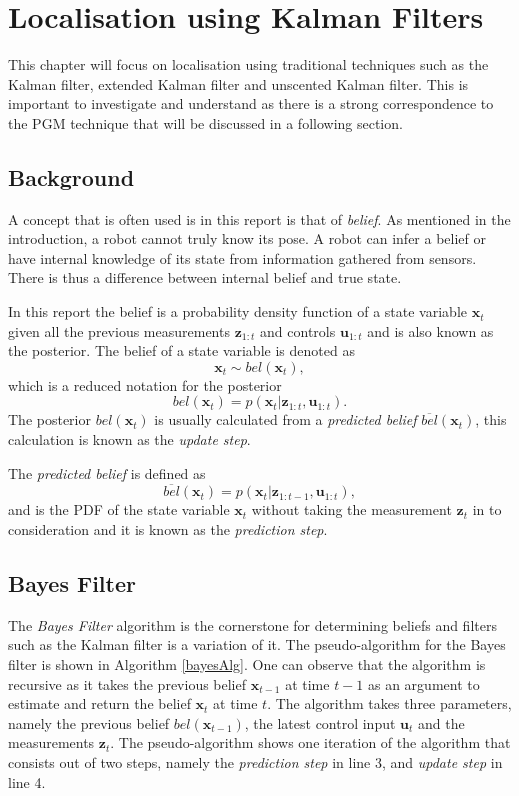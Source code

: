 \documentclass[12pt,oneside,openany,a4paper, %
afrikaans,english,
]{memoir}
\numberwithin{equation}{chapter}
\begin{document}
\chapter{Localisation using Kalman Filters}
This chapter will focus on localisation using traditional techniques such as the Kalman filter, extended Kalman filter and unscented Kalman filter. This is important to investigate and understand as there is a strong correspondence to the PGM technique that will be discussed in a following section.
\section{Background}
A concept that is often used is in this report is that of \textit{belief}. As mentioned in the introduction, a robot cannot truly know its pose. A robot can infer a belief or have internal knowledge of its state from information gathered from sensors. There is thus a difference between internal belief and true state.

In this report the belief is a probability density function of a state variable $\bm{x}_t$ given all the previous measurements $\bm{z}_{1:t}$  and controls $\bm{u}_{1:t}$ and is also known as the posterior. The belief of a state variable is denoted as
\begin{equation}
\bm{x}_t \sim bel(\bm{x}_t),
\end{equation}
which is a reduced notation for the posterior
\begin{equation}
bel(\bm{x}_t) = p(\bm{x}_t| \bm{z}_{1:t}, \bm{u}_{1:t}).
\end{equation}
The posterior $bel(\bm{x}_t)$ is usually calculated from a \textit{predicted belief} $\overline{bel}(\bm{x}_t)$, this calculation is known as the \textit{update step}.

The \textit{predicted belief} is defined as
\begin{equation}
\overline{bel}(\bm{x}_t) = p(\bm{x}_t|\bm{z}_{1:t-1}, \bm{u}_{1:t}),
\end{equation} 
and is the PDF of the state variable $\bm{x}_t$ without taking the measurement $\bm{z}_t$ in to consideration and it is known as the \textit{prediction step}.
\section{Bayes Filter}
The \textit{Bayes Filter} algorithm is the cornerstone for determining beliefs and filters such as the Kalman filter is a variation of it. The pseudo-algorithm for the Bayes filter is shown in Algorithm \ref{bayesAlg}. One can observe that the algorithm is recursive as it takes the previous belief $\bm{x}_{t-1}$ at time $t-1$ as an argument to estimate and return the belief $\bm{x}_t$ at time $t$. The algorithm takes three parameters, namely the previous belief $bel(\bm{x}_{t-1})$, the latest control input $\bm{u}_t$ and the measurements $\bm{z}_t$. The pseudo-algorithm shows one iteration of the algorithm that consists out of two steps, namely the \textit{prediction step} in line 3, and \textit{update step} in line 4.
\end{document}
